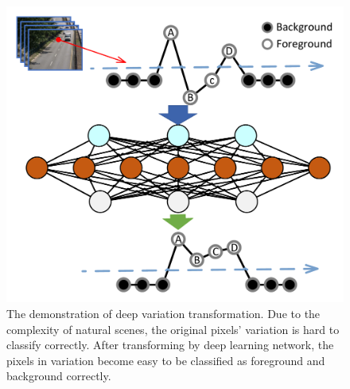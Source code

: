\documentclass[journal]{IEEEtran}
\begin{document}
\begin{figure}[!t]	%
\centering
    \includegraphics[width=\linewidth]{figure/demo.pdf}
    \caption{The demonstration of deep variation transformation. Due to the complexity of natural scenes, the original pixels' variation is hard to classify correctly. After transforming by deep learning network, the pixels in variation become easy to be classified as foreground and background correctly.}
    \label{idea}
\end{figure}

\end{document}
